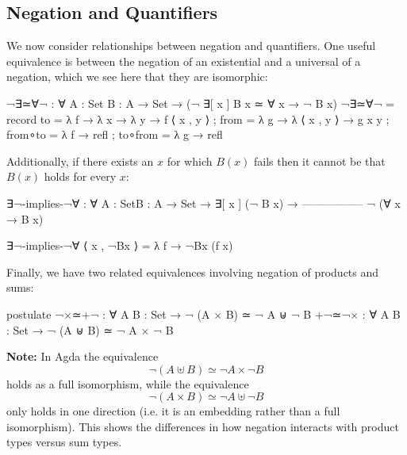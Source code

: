 \documentclass{lecturenotes}
\begin{document}
\subsection{Negation and Quantifiers}
We now consider relationships between negation and quantifiers.
One useful equivalence is between the negation of an existential and a universal of a negation,
which we see here that they are isomorphic:
\begin{code}
¬∃≃∀¬ : ∀ {A : Set} {B : A → Set} →
  (¬ ∃[ x ] B x ≃ ∀ x → ¬ B x)
¬∃≃∀¬ =
  record
  {
    to      = λ {f → λ x → λ y → f ⟨ x , y ⟩ }
   ; from    = λ {g → λ { ⟨ x , y ⟩ → g x y } }
   ; from∘to = λ f → refl
   ; to∘from = λ g → refl
   }
\end{code}
Additionally, if there exists an $x$ for which $B(x)$ fails then it cannot be that $B(x)$ holds for every $x$:
\begin{code}
∃¬-implies-¬∀ : ∀ {A : Set}{B : A → Set} →
  ∃[ x ] (¬ B x) →
  -----------------
  ¬ (∀ x → B x)

∃¬-implies-¬∀ ⟨ x , ¬Bx ⟩ = λ f → ¬Bx (f x)
\end{code}
Finally, we have two related equivalences involving negation of products and sums:
\begin{code}
postulate
  ¬×≃+¬ : ∀ {A B : Set} → ¬ (A × B) ≃ ¬ A ⊎ ¬ B
  +¬≃¬× : ∀ {A B : Set} → ¬ (A ⊎ B) ≃ ¬ A × ¬ B
\end{code}
\textbf{Note:} In Agda the equivalence 
\[
\neg (A \uplus B) \simeq \neg A \times \neg B
\]
holds as a full isomorphism, while the equivalence 
\[
\neg (A \times B) \simeq \neg A \uplus \neg B
\]
only holds in one direction (i.e. it is an embedding rather than a full isomorphism). 
This shows the differences in how negation interacts with product types versus sum types.
\end{document}
